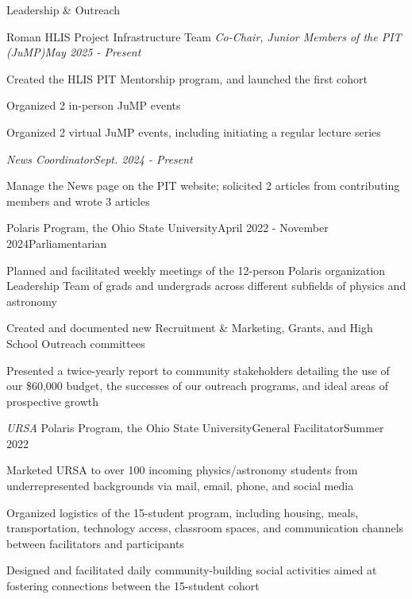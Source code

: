 \documentclass{resume} %
\begin{document}
\begin{rSection}{Leadership \& Outreach} 
\vspace{.3em}

\begin{rSubsection}{Roman HLIS Project Infrastructure Team}{}{}{}
\vspace{.3em}
\textit{Co-Chair, Junior Members of the PIT (JuMP)}\hfill{\textit{May 2025 - Present}}
\vspace{.3em}
\item Created the HLIS PIT Mentorship program, and launched the first cohort
\item Organized 2 in-person JuMP events
\item Organized 2 virtual JuMP events, including initiating a regular lecture series

\vspace{.3em}

\textit{News Coordinator}\hfill\textit{Sept. 2024 - Present}
\vspace{.3em}
\item Manage the News page on the PIT website; solicited 2 articles from contributing members and wrote 3 articles
\end{rSubsection}

\begin{rSubsection}{Polaris Program, the Ohio State University}{April 2022 - November 2024}{Parliamentarian}{}
\item Planned and facilitated weekly meetings of the 12-person Polaris organization Leadership Team of grads and undergrads across different subfields of physics and astronomy
\item Created and documented new Recruitment \& Marketing, Grants, and High School Outreach committees
\item Presented a twice-yearly report to community stakeholders detailing the use of our \$60,000 budget, the successes of our outreach programs, and ideal areas of prospective growth
\end{rSubsection}


\begin{rSubsection}{\textit{URSA} Polaris Program, the Ohio State University}{}{General Facilitator}{Summer 2022}
\item Marketed URSA to over 100 incoming physics/astronomy students from underrepresented backgrounds via mail, email, phone, and social media
\item Organized logistics of the 15-student program, including housing, meals, transportation, technology access, classroom spaces, and communication channels between facilitators and participants
\item Designed and facilitated daily community-building social activities aimed at fostering connections between the 15-student cohort
\end{rSubsection}

\end{rSection}
\end{document}
